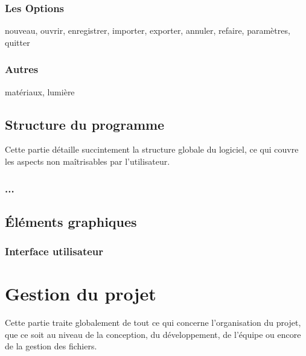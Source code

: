 \documentclass[a4paper]{memoir}
\begin{document}
			\subsection{Les Options}
				nouveau, ouvrir, enregistrer, importer, exporter, annuler, refaire, paramètres, quitter
		
			\subsection{Autres}
				matériaux, lumière
	
		\section{Structure du programme}
			Cette partie détaille succintement la structure globale du logiciel, ce qui couvre les aspects non maîtrisables par l'utilisateur.
			
			\subsection{...}
				
			
		\section{\'Eléments graphiques}
			\subsection{Interface utilisateur}
				
		
		
	\chapter{Gestion du projet}
		Cette partie traite globalement de tout ce qui concerne l'organisation du projet, que ce soit au niveau de la conception, du développement, de l'équipe ou encore de la gestion des fichiers.
		
\end{document}
